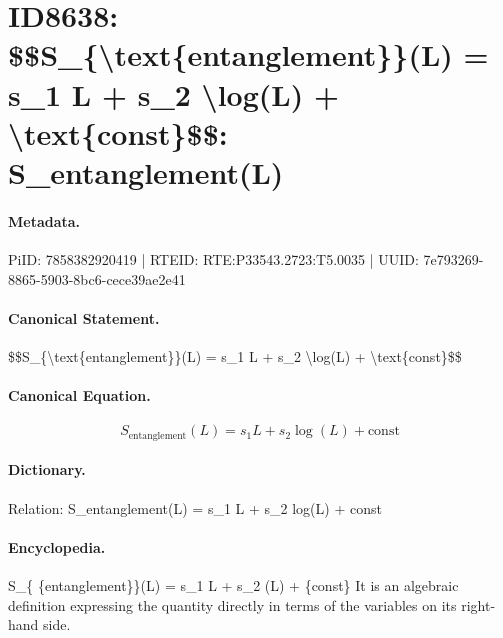 \section*{ID8638: \$\$S\_\{\textbackslash{}text\{entanglement\}\}(L) = s\_1 L + s\_2 \textbackslash{}log(L) + \textbackslash{}text\{const\}\$\$: S\_entanglement(L)}
\paragraph{Metadata.}
PiID: 7858382920419 | RTEID: RTE:P33543.2723:T5.0035 | UUID: 7e793269-8865-5903-8bc6-cece39ae2e41

\paragraph{Canonical Statement.}
\$\$S\_\{\textbackslash{}text\{entanglement\}\}(L) = s\_1 L + s\_2 \textbackslash{}log(L) + \textbackslash{}text\{const\}\$\$

\paragraph{Canonical Equation.}
\[
S_{\text{entanglement}}(L) = s_1 L + s_2 \log(L) + \text{const}
\]

\paragraph{Dictionary.}
Relation: S\_entanglement(L) = s\_1 L + s\_2 log(L) + const

\paragraph{Encyclopedia.}
S\_\{ \{entanglement\}\}(L) = s\_1 L + s\_2 (L) + \{const\} It is an algebraic definition expressing the quantity directly in terms of the variables on its right-hand side.
